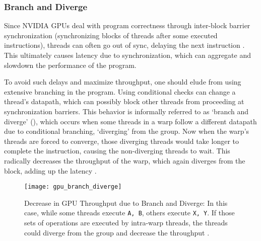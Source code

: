 \subsubsection{Branch and Diverge}
Since NVIDIA GPUs deal with program correctness through inter-block barrier synchronization (synchronizing blocks of threads after some executed instructions), threads can often go out of sync, delaying the next instruction \cite[Appendix~B]{PattersonARM}. This ultimately causes latency due to synchronization, which can aggregate and slowdown the performance of the program.

To avoid such delays and maximize throughput, one should elude from using extensive branching in the program. Using conditional checks can change a thread's datapath, which can possibly block other threads from proceeding at synchronization barriers. This behavior is informally referred to as `branch and diverge' (), which occurs when some threads in a warp follow a different datapath due to conditional branching, `diverging' from the group. Now when the warp's threads are forced to converge, those diverging threads would take longer to complete the instruction, causing the non-diverging threads to wait. This radically decreases the throughput of the warp, which again diverges from the block, adding up the latency \cite[Appendix~B]{PattersonARM}\cite{DemystifyingGPU}.
\begin{figure}[!htbp]
    \centering
    \texttt{[image: gpu\_branch\_diverge]}
    \caption[Decrease in GPU Throughput due to Branch and Diverge]{Decrease in GPU Throughput due to Branch and Diverge: In this case, while some threads execute \texttt{A, B}, others execute \texttt{X, Y}. If those sets of operations are executed by intra-warp threads, the threads could diverge from the group and decrease the throughput \cite{ParallelNVIDIA}.}
    \label{fig:Decrease in GPU Throughput due to Branch and Diverge}
\end{figure}

